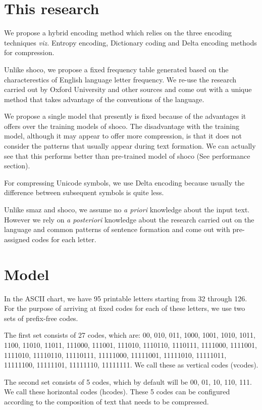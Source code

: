 \documentclass[]{article}
\begin{document}
\section{This research}

We propose a hybrid encoding method which relies on the three encoding techniques \emph{viz.} Entropy encoding, Dictionary coding and Delta encoding methods for compression.

Unlike shoco, we propose a fixed frequency table generated based on the characterestics of English language letter frequency.  We re-use the research carried out by Oxford University \cite{7} and other sources \cite{7} \cite{9} and come out with a unique method that takes advantage of the conventions of the language.

We propose a single model that presently is fixed because of the advantages it offers over the training models of shoco. The disadvantage with the training model, although it may appear to offer more compression, is that it does not consider the patterns that usually appear during text formation. We can actually see that this performs better than pre-trained model of shoco (See performance section).

For compressing Unicode symbols, we use Delta encoding because usually the difference between subsequent symbols is quite less.

Unlike smaz and shoco, we assume no \emph{a priori} knowledge about the input text.  However we rely on \emph{a posteriori} knowledge about the research carried out on the language and common patterns of sentence formation and come out with pre-assigned codes for each letter.

\section{Model}

In the ASCII chart, we have 95 printable letters starting from 32 through 126.  For the purpose of arriving at fixed codes for each of these letters, we use two sets of prefix-free codes.

The first set consists of 27 codes, which are: 00, 010, 011, 1000, 1001, 1010, 1011, 1100, 11010, 11011, 111000, 111001, 111010, 1110110, 1110111, 1111000, 1111001, 1111010, 11110110, 11110111, 11111000, 11111001, 11111010, 11111011, 11111100, 11111101, 11111110, 11111111.  We call these as vertical codes (vcodes).

The second set consists of 5 codes, which by default will be 00, 01, 10, 110, 111.  We call these horizontal codes (hcodes).  These 5 codes can be configured according to the composition of text that needs to be compressed.
\end{document}
